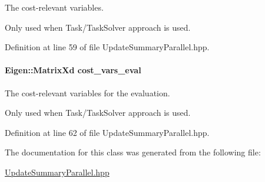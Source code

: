 The cost-\/relevant variables. 

Only used when Task/\+Task\+Solver approach is used. 

Definition at line 59 of file Update\+Summary\+Parallel.\+hpp.

\hypertarget{classDmpBbo_1_1UpdateSummaryParallel_a309e381520075afa088c97bf1e7e6cd0}{
\paragraph[{cost\+\_\+vars\+\_\+eval}]{\setlength{\rightskip}{0pt plus 5cm}Eigen\+::\+Matrix\+Xd cost\+\_\+vars\+\_\+eval}}\label{classDmpBbo_1_1UpdateSummaryParallel_a309e381520075afa088c97bf1e7e6cd0}


The cost-\/relevant variables for the evaluation. 

Only used when Task/\+Task\+Solver approach is used. 

Definition at line 62 of file Update\+Summary\+Parallel.\+hpp.



The documentation for this class was generated from the following file\+:\begin{DoxyCompactItemize}
\item 
\hyperlink{UpdateSummaryParallel_8hpp}{Update\+Summary\+Parallel.\+hpp}\end{DoxyCompactItemize}
